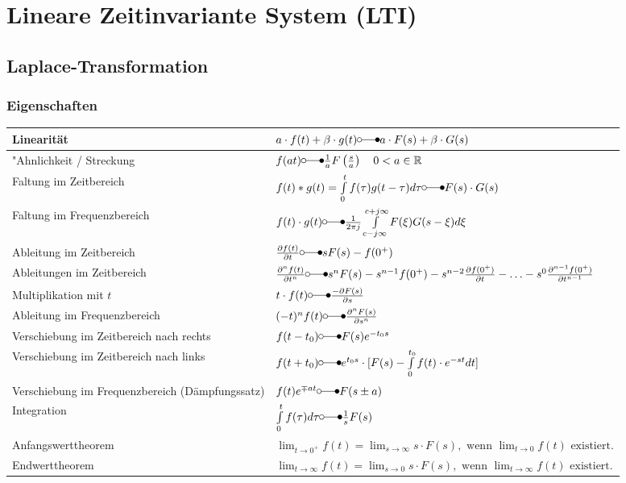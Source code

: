 \section{Lineare Zeitinvariante System (LTI)}
\subsection{Laplace-Transformation}


 	\subsubsection{Eigenschaften}
  		\renewcommand{\arraystretch}{2}
		\begin{tabularx}{\textwidth}{|l|X|}
        	\hline
        	Linearität & 
 			$a\cdot f(t) + \beta\cdot g(t) \laplace a\cdot F(s) + \beta\cdot
 			G(s)$ \\
 			\hline
 			"Ahnlichkeit / Streckung &
 			$f(a t) \laplace \frac{1}{a}F \left (\frac{s}{a} \right ) \quad 0
 			<a \in\mathbb{R}$ \\
 			\hline
 			Faltung im Zeitbereich &
 			$f(t) \ast g(t) = \int\limits_{0}^{t} f(\tau)g(t-\tau)d\tau \laplace F(s)
 			\cdot G(s)$\\
 			\hline
 			Faltung im Frequenzbereich &
 			$f(t) \cdot g(t) \laplace \frac{1}{2\pi j}\int\limits_{c-j\infty}^{c+j\infty}
 			F(\xi) G(s-\xi)d\xi$ \\
 			\hline
 			Ableitung im Zeitbereich &
 			$\frac{\partial f(t)}{\partial t} \laplace sF(s)
 			-f(0^+)$ \\
 			\hline
 			Ableitungen im Zeitbereich &
 			$\frac{\partial^n f(t)}{\partial t^n} \laplace s^nF(s)
 			-s^{n-1}f(0^+)-s^{n-2}\frac{\partial f(0^+)}{\partial t}-\ldots
 			-s^0\frac{\partial^{n-1} f(0^+)}{\partial t^{n-1}}$ \\
 			\hline
 			Multiplikation mit $t$ &
 			$t\cdot f(t)  \laplace \frac{-\partial F(s)}{\partial s}$ \\
 			\hline
 			Ableitung im Frequenzbereich &
 			$(-t)^n f(t) \laplace  \frac{\partial^n F(s)}{\partial s^n}$ \\
 			\hline
 			Verschiebung im Zeitbereich nach rechts &
 			$f(t - t_0) \laplace F(s)e^{- t_0 s}$ \\
 			\hline
			Verschiebung im Zeitbereich nach links &
			$f(t + t_0) \laplace e^{t_0 s} \cdot [F(s) - \int\limits_0^{t_0} f(t) \cdot e^{-st} dt]$\\
			\hline
 			Verschiebung im Frequenzbereich (Dämpfungssatz) &
 			$f(t)e^{\mp a t} \laplace F(s\pm a)$ \\
 			\hline
 			Integration &
 			$\int\limits_0^t f(\tau)d\tau \laplace \frac{1}{s}F(s)$ \\
 			\hline
 			Anfangswerttheorem &
 			$\lim_{t\rightarrow 0^+} f(t) = \lim_{s\rightarrow \infty} s \cdot F(s),\text{~wenn
 			}  \lim_{t\rightarrow 0} f(t)\text{~existiert}.$ \\
 			\hline
 			Endwerttheorem &
 			$\lim_{t\rightarrow \infty} f(t) = \lim_{s\rightarrow 0} s \cdot F(s),\text{~wenn
 			}  \lim_{t\rightarrow \infty} f(t)\text{~existiert.}$ \\
 			\hline
       	\end{tabularx}
\newpage

